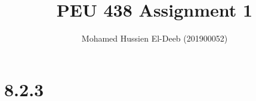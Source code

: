 \documentclass[12pt]{article}
\title{PEU 438 Assignment 1}
\author{Mohamed Hussien El-Deeb (201900052)}
\date{}
\begin{document}
\maketitle
\tableofcontents

\newcommand{\Lagr}{\mathcal{L}}

\section{8.2.3}

\newpage



\nocite{El-Deeb_PEU-438_Assignments}
\end{document}
